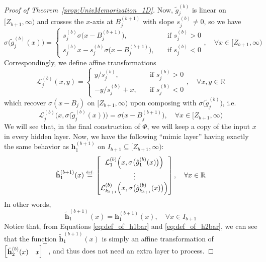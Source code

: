 \documentclass{article}
\numberwithin{equation}{section}
\theoremstyle{definition}
\newcommand{\eqdef}{\ensuremath{\stackrel{\mbox{\upshape\tiny def.}}{=}}}
\begin{document}
\begin{proof}[{Proof of Theorem~\ref{prop:UnivMemorization_1D}}]
Now, $\tilde{g}_j^{(b)}$ is linear on $[Z_{b+1},\infty)$ and crosses the $x$-axis at $B_j^{(b+1)}$ with slope $s_j^{(b)}\ne 0$, so we have 
\[
\sigma \big( \tilde{g}_j^{(b)} (x) \big)  
= 
\begin{cases}
    s_j^{(b)} \sigma\big(x - B_j^{(b+1)}\big), \quad
    &\text{if } s_j^{(b)}>0  
    \\
    s_j^{(b)}x - s_j^{(b)} \sigma\big(x - B_j^{(b+1)}\big), \quad
    &\text{if } s_j^{(b)}<0
\end{cases},
\quad \forall x\in [Z_{b+1},\infty)
\]
Correspondingly, we define affine transformations 
\[
\mathcal{L}_j^{(b)} (x,y) = 
\begin{cases}
    y/s_j^{(b)}, \quad
    &\text{if } s_j^{(b)}>0  
    \\
    -y/s_j^{(b)} + x, \quad
    &\text{if } s_j^{(b)}<0
\end{cases},
\quad \forall x,y\in \mathbb{R}
\]
which recover $\sigma(x - B_j)$ on $[Z_{b+1},\infty)$ upon composing with $\sigma \big( \tilde{g}_j^{(b)} \big)$, i.e. 
\[
\mathcal{L}_j^{(b)} \Big(x, \sigma \big( \tilde{g}_j^{(b)}(x) \big) \Big) 
= 
\sigma\big(x - B_j^{(b+1)}\big),
\quad \forall x\in [Z_{b+1},\infty)
\]
We will see that, in the final construction of $\Phi$, we will keep a copy of the input $x$ in every hidden layer. Now, we have the following ``mimic layer'' having exactly the same behavior as $\mathbf{h}_1^{(b+1)}$ on $I_{b+1} \subseteq [Z_{b+1},\infty)$: 
\begin{equation}
\label{eq:def_of_h1bar}
    \tilde{\mathbf{h}}_1^{(b+1)} (x)
    \eqdef 
    \begin{bmatrix}
        \mathcal{L}_1^{(b)} 
        \Big(x, \sigma \big( \tilde{g}_1^{(b)}(x) \big) \Big)  \\
        \vdots  \\
        \mathcal{L}_{k_{b+1}}^{(b)} 
        \Big(x, \sigma \big( \tilde{g}_{k_{b+1}}^{(b)}(x) \big) \Big)  \\
    \end{bmatrix},
    \quad \forall x \in \mathbb{R}
\end{equation}
In other words, 
\[
    \tilde{\mathbf{h}}_1^{(b+1)} (x) 
    =
    \mathbf{h}_1^{(b+1)} (x) ,
    \quad \forall x \in I_{b+1}
\]
Notice that, from Equations \ref{eq:def_of_h1bar} and \ref{eq:def_of_h2bar}, we can see that the function $\tilde{\mathbf{h}}_1^{(b+1)} (x)$ is simply an affine transformation of $\begin{bmatrix} \Bar{\mathbf{h}}_2^{(b)} (x) & x \end{bmatrix}^{\top}$, and thus does not need an extra layer to process. 


\end{proof}
\end{document}
